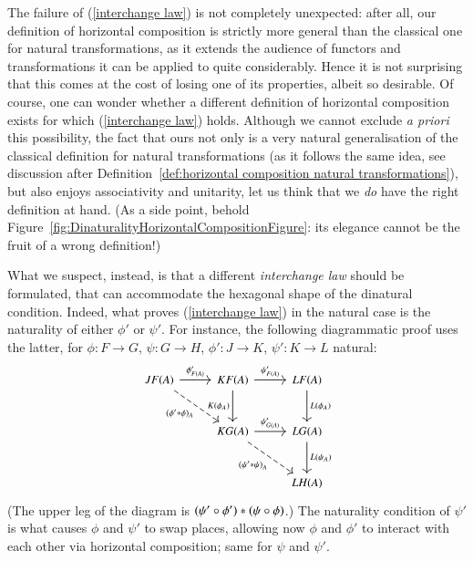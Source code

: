 The failure of (\ref{interchange law}) is not completely unexpected: after all, our definition of horizontal composition is strictly more general than the classical one for natural transformations, as it extends the audience of functors and transformations it can be applied to quite considerably. Hence it is not surprising that this comes at the cost of losing one of its properties, albeit so desirable. Of course, one can wonder whether a different definition of horizontal composition exists for which (\ref{interchange law}) holds. Although we cannot exclude \emph{a priori} this possibility, the fact that ours not only is a very natural generalisation of the classical definition for natural transformations (as it follows the same idea, see discussion after Definition~\ref{def:horizontal composition natural transformations}), but also enjoys associativity and unitarity, let us think that we \emph{do} have the right definition at hand. (As a side point, behold Figure~\ref{fig:DinaturalityHorizontalCompositionFigure}: its elegance cannot be the fruit of a wrong definition!)

What we suspect, instead, is that a different \emph{interchange law} should be formulated, that can accommodate the hexagonal shape of the dinatural condition. Indeed, what proves (\ref{interchange law}) in the natural case is the naturality of either $\phi'$ or $\psi'$. For instance, the following diagrammatic proof uses the latter, for $\phi \colon F \to G$, $\psi \colon G \to H$, $\phi' \colon J \to K$, $\psi' \colon K \to L$ natural:
\[
\begin{tikzcd}[row sep=2.5em,column sep=2.5em,font=\small]
JF(A) \ar[r,"{\phi'_{F(A)}}"] \ar[rd,dashed,"{(\hc \phi {\phi'})_A}"'] & KF(A) \ar[r,"\psi'_{F(A)}"] \ar[d,"K(\phi_A)"'] & LF(A) \ar[d,"L(\phi_A)"] \\
& KG(A) \ar[r,"\psi'_{G(A)}"] \ar[dr,dashed,"{(\hc \psi {\psi'})}_A"'] & LG(A) \ar[d,"L(\psi_A)"] \\
& & LH(A)
\end{tikzcd}
\]
(The upper leg of the diagram is $	\hc {(\psi \circ \phi)} {(\psi' \circ \phi')}$.) The naturality condition of $\psi'$ is what causes $\phi$ and $\psi'$ to swap places, allowing now $\phi$ and $\phi'$ to interact with each other via horizontal composition; same for $\psi$ and $\psi'$. 

